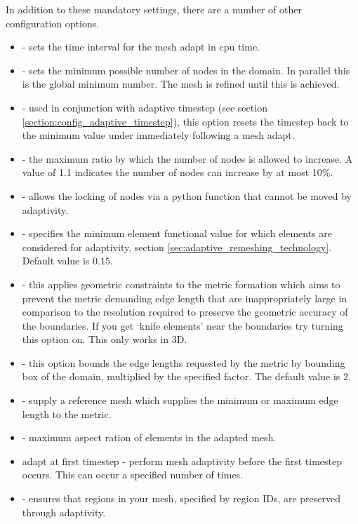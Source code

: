 In addition to these mandatory settings, there are a number of other configuration options.
\begin{itemize}
\item {} - sets the time interval for the mesh adapt in cpu time.
\item {} - sets the minimum possible number of nodes in the domain. In parallel this is the
global minimum number. The mesh is refined until this is achieved.
\item {} - used in conjunction with adaptive timestep (see section \ref{section:config_adaptive_timestep}), this
option resets the timestep back to the minimum value under  immediately following
a mesh adapt.
\item {} - the maximum ratio by which the number of nodes is allowed to increase. A value of 1.1
indicates the number of nodes can increase by at most 10\%.
\item {} - allows the locking of nodes via a python function that cannot be moved by adaptivity.
\item {} - specifies the minimum element functional value for which elements are considered for adaptivity, section \ref{sec:adaptive_remeshing_technology}. Default value is $0.15$.
\item {} - this applies geometric constraints to the metric formation which aims to prevent the metric demanding edge length that are inappropriately large in comparison to the resolution required to preserve the geometric accuracy of the boundaries. If you get `knife elements' near the boundaries try turning this option on. This only works in 3D.
\item {} - this option bounds the edge lengths requested by the metric by bounding box of the domain, multiplied by the specified factor. The default value is $2$.
\item {} - supply a reference mesh which supplies the minimum or maximum edge length to the metric.
\item {} -  maximum aspect ration of elements in the adapted mesh.
\item adapt at first timestep - perform mesh adaptivity before the first timestep occurs. This can occur a specified number of times.
\item {} - ensures that regions in your mesh, specified by region IDs, are preserved through adaptivity.

\end{itemize}
